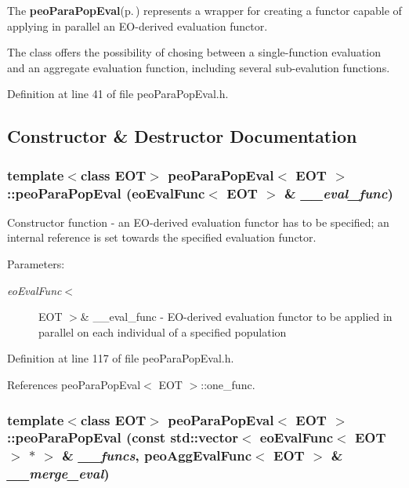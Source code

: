 The {\bf peo\-Para\-Pop\-Eval}{\rm (p.\,\pageref{classpeo_para_pop_eval})} represents a wrapper for creating a functor capable of applying in parallel an EO-derived evaluation functor. 

The class offers the possibility of chosing between a single-function evaluation and an aggregate evaluation function, including several sub-evalution functions. 



Definition at line 41 of file peo\-Para\-Pop\-Eval.h.

\subsection{Constructor \& Destructor Documentation}
\subsubsection{\setlength{\rightskip}{0pt plus 5cm}template$<$class EOT$>$ {\bf peo\-Para\-Pop\-Eval}$<$ EOT $>$::{\bf peo\-Para\-Pop\-Eval} (eo\-Eval\-Func$<$ EOT $>$ \& {\em \_\-\_\-eval\_\-func})}\label{classpeo_para_pop_eval_bcb540510a7038520bec41a7af332daf}


Constructor function - an EO-derived evaluation functor has to be specified; an internal reference is set towards the specified evaluation functor. 

\begin{Desc}
\item[Parameters:]
\begin{description}
\item[{\em eo\-Eval\-Func$<$}]EOT $>$\& \_\-\_\-eval\_\-func - EO-derived evaluation functor to be applied in parallel on each individual of a specified population \end{description}
\end{Desc}


Definition at line 117 of file peo\-Para\-Pop\-Eval.h.

References peo\-Para\-Pop\-Eval$<$ EOT $>$::one\_\-func.
\subsubsection{\setlength{\rightskip}{0pt plus 5cm}template$<$class EOT$>$ {\bf peo\-Para\-Pop\-Eval}$<$ EOT $>$::{\bf peo\-Para\-Pop\-Eval} (const std::vector$<$ eo\-Eval\-Func$<$ EOT $>$ $\ast$ $>$ \& {\em \_\-\_\-funcs}, {\bf peo\-Agg\-Eval\-Func}$<$ EOT $>$ \& {\em \_\-\_\-merge\_\-eval})}\label{classpeo_para_pop_eval_1cc13a1ec366f95d219d682eccb455bc}


